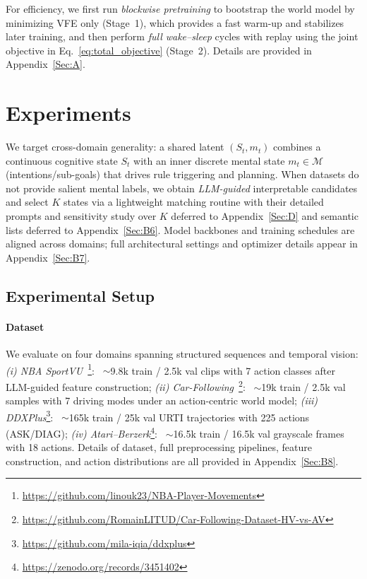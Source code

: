 \documentclass{article} %
\newcommand{\Shuang}[1]{{\color{red}{\sf[Shuang: #1]}}}
\begin{document}
For efficiency, we first run \emph{blockwise pretraining} to bootstrap the world model by minimizing VFE only (Stage~1), which provides a fast warm-up and stabilizes later training, 
and then perform \emph{full wake--sleep} cycles with replay using the joint objective in Eq.~\ref{eq:total_objective} (Stage~2). Details are provided in Appendix~\ref{Sec:A}.


\section{Experiments}
\label{sec:experiments}


We target cross-domain generality: a shared latent $(S_t,m_t)$ combines a continuous cognitive state $S_t$ with an inner discrete mental state $m_t\in\mathcal{M}$ (intentions/sub-goals) that drives rule triggering and planning.
When datasets do not provide salient mental labels, we obtain \emph{LLM-guided} interpretable candidates and select $K$ states via a lightweight matching routine with their detailed prompts and  sensitivity study over $K$ deferred to Appendix~\ref{Sec:D} and  semantic lists deferred to Appendix~\ref{Sec:B6}.
Model backbones and training schedules are aligned across domains; full architectural settings and optimizer details appear in Appendix~\ref{Sec:B7}.

\subsection{Experimental Setup}

\paragraph{Dataset}
We evaluate on four domains spanning structured sequences and temporal vision:
\emph{(i) NBA SportVU}~\citep{kambhamettu2024quantifying}\footnote{\url{https://github.com/linouk23/NBA-Player-Movements}}:
~$\sim$9.8k train / 2.5k val clips with 7 action classes after LLM-guided feature construction;
\emph{(ii) Car-Following}~\citep{li2023large}\footnote{\url{https://github.com/RomainLITUD/Car-Following-Dataset-HV-vs-AV}}:
~$\sim$19k train / 2.5k val samples with 7 driving modes under an action-centric world model;
\emph{(iii) DDXPlus}\footnote{\url{https://github.com/mila-iqia/ddxplus}}:
~$\sim$165k train / 25k val URTI trajectories with 225 actions (ASK/DIAG);
\emph{(iv) Atari--Berzerk}\footnote{\url{https://zenodo.org/records/3451402}}:
~$\sim$16.5k train / 16.5k val grayscale frames with 18 actions.
Details of dataset, full preprocessing pipelines, feature construction, and action distributions are all provided in Appendix~\ref{Sec:B8}.
\end{document}
